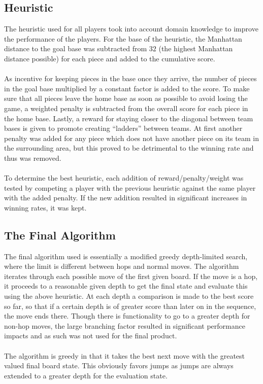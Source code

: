 \documentclass[paper=a4, fontsize=11pt]{scrartcl}
\numberwithin{equation}{section}		%
\numberwithin{figure}{section}			%
\numberwithin{table}{section}				%
\begin{document}
\subsection{Heuristic}
The heuristic used for all players took into account domain knowledge to improve the performance of the players. For the base of the heuristic, the Manhattan distance to the goal base was subtracted from $32$ (the highest Manhattan distance possible) for each piece and added to the cumulative score. \\\\As incentive for keeping pieces in the base once they arrive, the number of pieces in the goal base multiplied by a constant factor is added to the score. To make sure that all pieces leave the home base as soon as possible to avoid losing the game, a weighted penalty is subtracted from the overall score for each piece in the home base. Lastly, a reward for staying closer to the diagonal between team bases is given to promote creating ``ladders'' between teams. At first another penalty was added for any piece which does not have another piece on its team in the surrounding area, but this proved to be detrimental to the winning rate and thus was removed.\\\\
To determine the best heuristic, each addition of reward/penalty/weight was tested by competing a player with the previous heuristic against the same player with the added penalty. If the new addition resulted in significant increases in winning rates, it was kept.

\subsection{The Final Algorithm}
The final algorithm used is essentially a modified greedy depth-limited search, where the limit is different between hops and normal moves. The algorithm iterates through each possible move of the first given board. If the move is a hop, it proceeds to a reasonable given depth to get the final state and evaluate this using the above heuristic. At each depth a comparison is made to the best score so far, so that if a certain depth is of greater score than later on in the sequence, the move ends there. Though there is functionality to go to a greater depth for non-hop moves, the large branching factor resulted in significant performance impacts and as such was not used for the final product. \\\\ The algorithm is greedy in that it takes the best next move with the greatest valued final board state. This obviously favors jumps as jumps are always extended to a greater depth for the evaluation state. 
\end{document}
